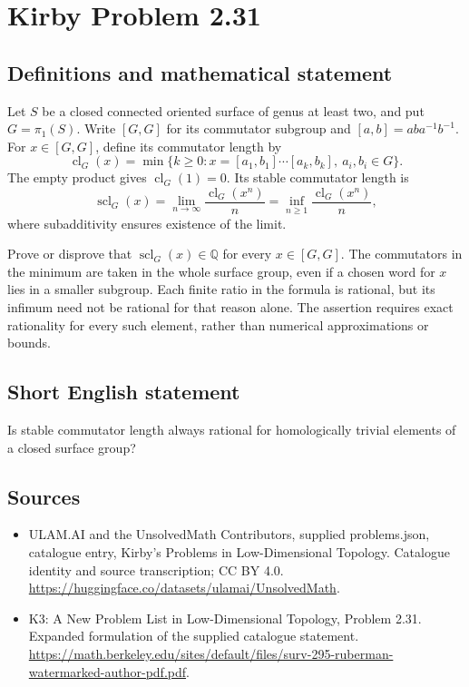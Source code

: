 \documentclass[11pt,a4paper]{article}
\begin{document}
\section*{Kirby Problem 2.31}\label{statement}

\subsection{Definitions and mathematical statement}
Let $S$ be a closed connected oriented surface of genus at least two, and put
$G=\pi_1(S)$. Write $[G,G]$ for its commutator subgroup and
$[a,b]=aba^{-1}b^{-1}$. For $x\in[G,G]$, define its commutator length by
\[
\operatorname{cl}_G(x)=\min\{k\geq0:x=[a_1,b_1]\cdots[a_k,b_k],\ a_i,b_i\in G\}.
\]
The empty product gives $\operatorname{cl}_G(1)=0$.
Its stable commutator length is
\[
\operatorname{scl}_G(x)=\lim_{n\to\infty}
\frac{\operatorname{cl}_G(x^n)}n
=\inf_{n\geq1}\frac{\operatorname{cl}_G(x^n)}n,
\]
where subadditivity ensures existence of the limit.

Prove or disprove that $\operatorname{scl}_G(x)\in\mathbb Q$ for every
$x\in[G,G]$. The commutators in the minimum are taken in the whole surface
group, even if a chosen word for $x$ lies in a smaller subgroup. Each finite
ratio in the formula is rational, but its infimum need not be rational for
that reason alone. The assertion requires exact rationality for every such
element, rather than numerical approximations or bounds.
\subsection{Short English statement}
Is stable commutator length always rational for homologically trivial elements of a closed surface group?
\subsection{Sources}
\begin{itemize}
\item[S1] ULAM.AI and the UnsolvedMath Contributors, supplied problems.json, catalogue entry, Kirby's Problems in Low-Dimensional Topology. Catalogue identity and source transcription; CC BY 4.0.
\url{https://huggingface.co/datasets/ulamai/UnsolvedMath}.
\item[S2] K3: A New Problem List in Low-Dimensional Topology, Problem 2.31. Expanded formulation of the supplied catalogue statement.
\url{https://math.berkeley.edu/sites/default/files/surv-295-ruberman-watermarked-author-pdf.pdf}.
\end{itemize}
\end{document}
